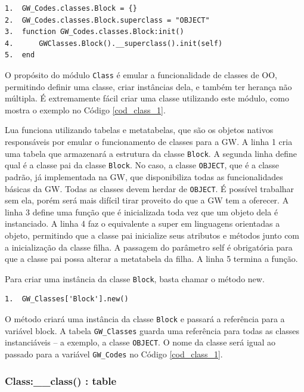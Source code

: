 \documentclass[
	12pt,				%
	openright,			%
	oneside,			%
	a4paper,			%
	brazil,				%
	]{abntex2}
\begin{document}
\begin{lstlisting}[caption={Exemplo de Criação de Classe},label=cod_class_1,frame=single]
1.	GW_Codes.classes.Block = {}
2.	GW_Codes.classes.Block.superclass = "OBJECT"
3.	function GW_Codes.classes.Block:init()
4.		GWClasses.Block().__superclass().init(self)
5.	end
\end{lstlisting}


O propósito do módulo \verb|Class| é emular a funcionalidade de classes de OO, permitindo definir uma classe, criar instâncias dela, e também ter herança não múltipla. É extremamente fácil criar uma classe utilizando este módulo, como mostra o exemplo no Código \ref{cod_class_1}.

Lua funciona utilizando tabelas e metatabelas, que são os objetos nativos responsáveis por emular o funcionamento de classes para a GW. A linha 1 cria uma tabela que armazenará a estrutura da classe \verb|Block|. A segunda linha define qual é a classe pai da classe \verb|Block|. No caso, a classe \verb|OBJECT|, que é a classe padrão, já implementada na GW, que disponibiliza todas as funcionalidades básicas da GW. Todas as classes devem herdar de \verb|OBJECT|. É possível trabalhar sem ela, porém será mais difícil tirar proveito do que a GW tem a oferecer. A linha 3 define uma função que é inicializada toda vez que um objeto dela é instanciado. A linha 4 faz o equivalente a super em linguagens orientadas a objeto, permitindo que a classe pai inicialize seus atributos e métodos junto com a inicialização da classe filha. A passagem do parâmetro self é obrigatória para que a classe pai possa alterar a metatabela da filha. A linha 5 termina a função.

Para criar uma instância da classe \verb|Block|, basta chamar o método new.

\begin{lstlisting}[caption={Instanciando uma Classe},label=cod_class_2,frame=single]
1.	GW_Classes['Block'].new()
\end{lstlisting}

O método criará uma instância da classe \verb|Block| e passará a referência para a variável block. A tabela \verb|GW_Classes| guarda uma referência para todas as classes instanciáveis – a exemplo, a classe \verb|OBJECT|. O nome da classe será igual ao passado para a variável \verb|GW_Codes| no Código \ref{cod_class_1}. 

\subsubsection{Class:\_\_class() : table}
\end{document}
